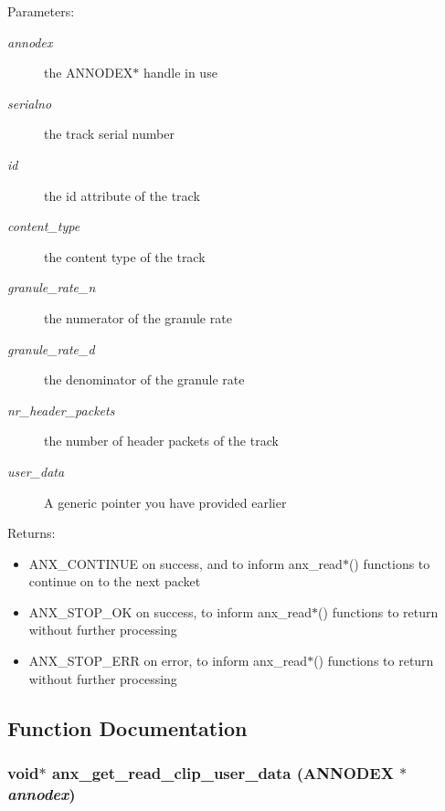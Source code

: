 \begin{Desc}
\item[Parameters:]
\begin{description}
\item[{\em annodex}]the ANNODEX$\ast$ handle in use \item[{\em serialno}]the track serial number \item[{\em id}]the id attribute of the track \item[{\em content\_\-type}]the content type of the track \item[{\em granule\_\-rate\_\-n}]the numerator of the granule rate \item[{\em granule\_\-rate\_\-d}]the denominator of the granule rate \item[{\em nr\_\-header\_\-packets}]the number of header packets of the track \item[{\em user\_\-data}]A generic pointer you have provided earlier \end{description}
\end{Desc}
\begin{Desc}
\item[Returns:]\begin{itemize}
\item ANX\_\-CONTINUE on success, and to inform anx\_\-read$\ast$() functions to continue on to the next packet\item ANX\_\-STOP\_\-OK on success, to inform anx\_\-read$\ast$() functions to return without further processing\item ANX\_\-STOP\_\-ERR on error, to inform anx\_\-read$\ast$() functions to return without further processing \end{itemize}
\end{Desc}


\subsection{Function Documentation}
\subsubsection{\setlength{\rightskip}{0pt plus 5cm}void$\ast$ anx\_\-get\_\-read\_\-clip\_\-user\_\-data ({\bf ANNODEX} $\ast$ {\em annodex})}\label{anx__read_8h_a12}


